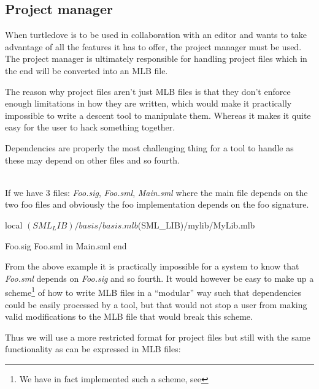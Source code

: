 \subsection{Project manager}

When turtledove is to be used in collaboration with an editor and wants to take
advantage of all the features it has to offer, the project manager must be
used. The project manager is ultimately responsible for handling project files
which in the end will be converted into an MLB file.

The reason why project files aren't just MLB files is that they don't enforce
enough limitations in how they are written, which would make it practically
impossible to write a descent tool to manipulate them. Whereas it makes it quite
easy for the user to hack something together.

Dependencies are properly the most challenging thing for a tool to handle as
these may depend on other files and so fourth. 

\begin{example}\ \\
  If we have 3 files: \textit{Foo.sig}, \textit{Foo.sml}, \textit{Main.sml}
  where the main file depends on the two foo files and obviously the foo
  implementation depends on the foo signature. 

  \begin{sml}
local
  $(SML_LIB)/basis/basis.mlb
  $(SML_LIB)/mylib/MyLib.mlb

  Foo.sig Foo.sml
in
  Main.sml
end    
  \end{sml}
\end{example}

\noindent
From the above example it is practically impossible for a system to know that
\textit{Foo.sml} depends on \textit{Foo.sig} and so fourth. It would however be
easy to make up a scheme\footnote{We have in fact implemented such a scheme, see
  } of how to write MLB files in a ``modular'' way such that
dependencies could be easily processed by a tool, but that would not stop a user
from making valid modifications to the MLB file that would break this scheme.


Thus we will use a more restricted format for project files but still with the
same functionality as can be expressed in MLB files:

